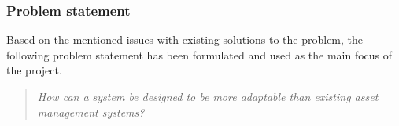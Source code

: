 \subsubsection*{Problem statement}
Based on the mentioned issues with existing solutions to the problem, the following problem statement has been formulated and used as the main focus of the project.

\begin{quote}
    \textit{How can a system be designed to be more adaptable than existing asset management systems?}
\end{quote}






